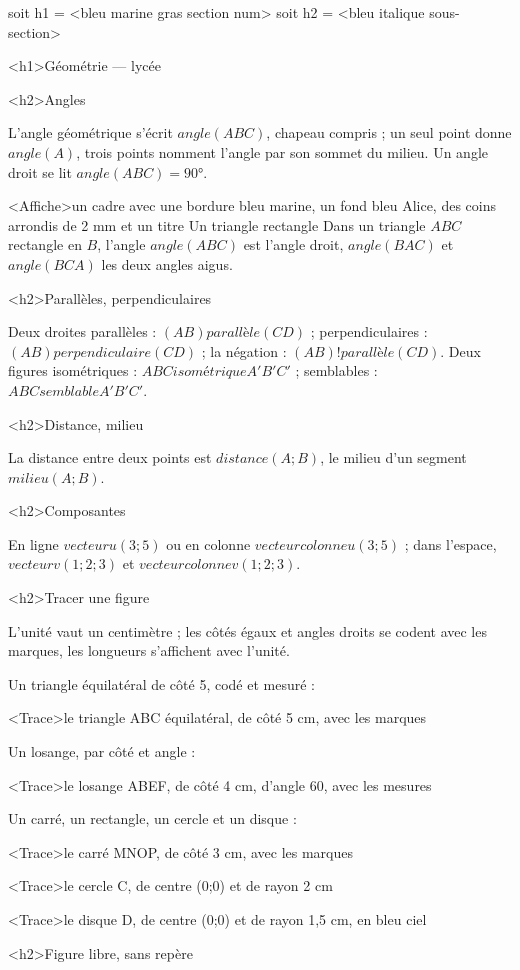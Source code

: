 \documentclass[marges=20, taille=11]{texecole}
\begin{document}
soit h1 = <bleu marine gras section num>
soit h2 = <bleu italique sous-section>

<h1>Géométrie — lycée


<h2>Angles

L'angle géométrique s'écrit $angle(ABC)$, chapeau compris ; un seul point donne $angle(A)$, trois points nomment l'angle par son sommet du milieu. Un angle droit se lit $angle(ABC) = 90°$.

<Affiche>un cadre avec une bordure bleu marine, un fond bleu Alice, des coins arrondis de 2 mm et un titre {Un triangle rectangle} {
	Dans un triangle $ABC$ rectangle en $B$, l'angle $angle(ABC)$ est
	l'angle droit, $angle(BAC)$ et $angle(BCA)$ les deux angles aigus.
}

<h2>Parallèles, perpendiculaires

Deux droites parallèles : $(AB) parallèle (CD)$ ; perpendiculaires :
$(AB) perpendiculaire (CD)$ ; la négation : $(AB) !parallèle (CD)$. Deux figures isométriques : $ABC isométrique A'B'C'$ ; semblables :
$ABC semblable A'B'C'$.

<h2>Distance, milieu

La distance entre deux points est $distance(A; B)$, le milieu d'un segment $milieu(A; B)$.

<h2>Composantes

En ligne $vecteur u(3;5)$ ou en colonne $vecteur colonne u(3;5)$ ; dans l'espace, $vecteur v(1;2;3)$ et $vecteur colonne v(1;2;3)$.

<h2>Tracer une figure

L'unité vaut un centimètre ; les côtés égaux et angles droits se codent avec les marques, les longueurs s'affichent avec l'unité.

Un triangle équilatéral de côté 5, codé et mesuré :

<Trace>le triangle ABC équilatéral, de côté 5 cm, avec les marques

Un losange, par côté et angle :

<Trace>le losange ABEF, de côté 4 cm, d'angle 60, avec les mesures

Un carré, un rectangle, un cercle et un disque :

<Trace>le carré MNOP, de côté 3 cm, avec les marques

<Trace>le cercle C, de centre (0;0) et de rayon 2 cm

<Trace>le disque D, de centre (0;0) et de rayon 1,5 cm, en bleu ciel

<h2>Figure libre, sans repère
\end{document}
